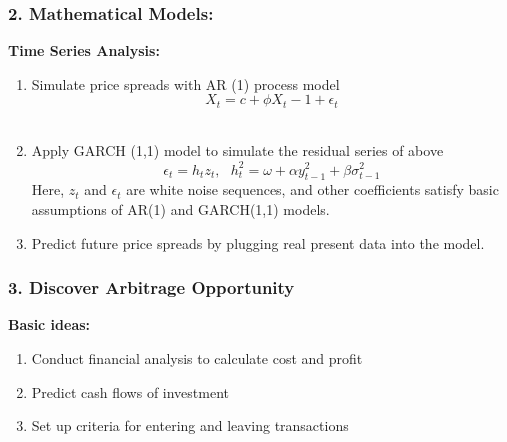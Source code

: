 \documentclass[compress,handout,10pt]{beamer}
\let\olditem\item
\renewcommand{\item}{\setlength{\itemsep}{0.5\baselineskip}\olditem}
\begin{document}
\begin{frame}
    \frametitle{2. Mathematical Models:}
{\bf{Time Series Analysis:}}\\
\vspace{7pt}
\begin{enumerate}
\item Simulate price spreads with AR (1) process model $$X_t=c+\phi X_t-1+\epsilon _t$$
\\
\item Apply GARCH (1,1) model to simulate the residual series of above$$\epsilon_t=h_tz_t, ~~~
h_t^2=\omega+\alpha y_{t-1}^2+\beta\sigma_{t-1}^2$$
Here, $z_t$ and $\epsilon_t$ are white noise sequences, and other coefficients satisfy basic assumptions of AR(1) and GARCH(1,1) models.
\item Predict future price spreads by plugging real present data into the model.
\end{enumerate}
\end{frame}
\begin{frame}
    \frametitle{3. Discover Arbitrage Opportunity}
{\bf{Basic ideas:}}\\
\begin{enumerate}
\item Conduct financial analysis to calculate cost and profit
\item Predict cash flows of investment
\item Set up criteria for entering and leaving transactions
\end{enumerate}
\end{frame}
\end{document}
